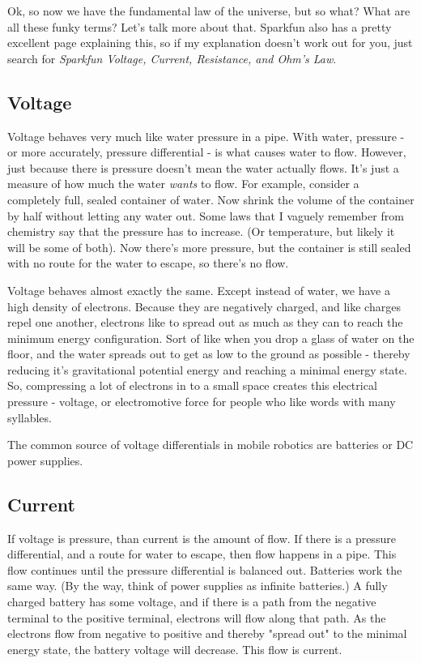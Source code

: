 Ok, so now we have the fundamental law of the universe, but so what? What are all these funky terms? Let's talk more about that. Sparkfun also has a pretty excellent page explaining this, so if my explanation doesn't work out for you, just search for \textit{Sparkfun Voltage, Current, Resistance, and Ohm's Law}.

\subsection{Voltage}
Voltage behaves very much like water pressure in a pipe. With water, pressure - or more accurately, pressure differential - is what causes water to flow. However, just because there is pressure doesn't mean the water actually flows. It's just a measure of how much the water \textit{wants} to flow. For example, consider a completely full, sealed container of water. Now shrink the volume of the container by half without letting any water out. Some laws that I vaguely remember from chemistry say that the pressure has to increase. (Or temperature, but likely it will be some of both). Now there's more pressure, but the container is still sealed with no route for the water to escape, so there's no flow.

Voltage behaves almost exactly the same. Except instead of water, we have a high density of electrons. Because they are negatively charged, and like charges repel one another, electrons like to spread out as much as they can to reach the minimum energy configuration. Sort of like when you drop a glass of water on the floor, and the water spreads out to get as low to the ground as possible - thereby reducing it's gravitational potential energy and reaching a minimal energy state. So, compressing a lot of electrons in to a small space creates this electrical pressure - voltage, or electromotive force for people who like words with many syllables.

The common source of voltage differentials in mobile robotics are batteries or DC power supplies.

\subsection{Current}

If voltage is pressure, than current is the amount of flow. If there is a pressure differential, and a route for water to escape, then flow happens in a pipe. This flow continues until the pressure differential is balanced out. Batteries work the same way. (By the way, think of power supplies as infinite batteries.) A fully charged battery has some voltage, and if there is a path from the negative terminal to the positive terminal, electrons will flow along that path. As the electrons flow from negative to positive and thereby "spread out" to the minimal energy state, the battery voltage will decrease. This flow is current.

